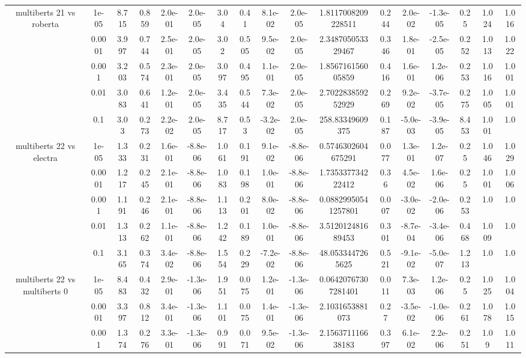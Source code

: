 \begin{tabular}{|c|c|c|c|c|c|c|c|c|c|c|c|c|c|c|c|c|}
\hline
\multirow{5}{*}{multiberts 21 vs roberta } & 1e-05 & 8.715 & 0.859 & 2.0e-01 & 2.0e-05 & 3.04 & 0.41 & 8.1e-02 & 2.0e-05 & 1.8117008209228511 & 0.244 & 2.0e-02 & -1.3e-05 & 0.25 & 1.024 & 1.016 \\
 & 0.0001 & 3.997 & 0.744 & 2.5e-01 & 2.0e-05 & 3.02 & 0.505 & 9.5e-02 & 2.0e-05 & 2.348705053329467 & 0.346 & 1.8e-01 & -2.5e-05 & 0.252 & 1.013 & 1.022 \\
 & 0.001 & 3.203 & 0.574 & 2.3e-01 & 2.0e-05 & 3.097 & 0.495 & 1.1e-01 & 2.0e-05 & 1.856716156005859 & 0.416 & 1.6e-01 & 1.2e-06 & 0.253 & 1.016 & 1.001 \\
 & 0.01 & 3.083 & 0.641 & 1.2e-01 & 2.0e-05 & 3.435 & 0.544 & 7.3e-02 & 2.0e-05 & 2.702283859252929 & 0.269 & 9.2e-02 & -3.7e-05 & 0.275 & 1.005 & 1.001 \\
 & 0.1 & 3.03 & 0.273 & 2.2e-02 & 2.0e-05 & 8.717 & 0.53 & -3.2e-02 & 2.0e-05 & 258.83349609375 & 0.187 & -5.0e-03 & -3.9e-05 & 8.453 & 1.001 & 1.0 \\
\hline
\multirow{5}{*}{multiberts 22 vs electra } & 1e-05 & 1.333 & 0.231 & 1.6e-01 & -8.8e-06 & 1.061 & 0.191 & 9.1e-02 & -8.8e-06 & 0.5746302604675291 & 0.077 & 1.3e-01 & 1.2e-07 & 0.25 & 1.046 & 1.029 \\
 & 0.0001 & 1.217 & 0.245 & 2.1e-01 & -8.8e-06 & 1.083 & 0.198 & 1.0e-01 & -8.8e-06 & 1.735337734222412 & 0.36 & 4.5e-02 & 1.6e-06 & 0.25 & 1.001 & 1.006 \\
 & 0.001 & 1.191 & 0.246 & 2.1e-01 & -8.8e-06 & 1.113 & 0.201 & 8.0e-02 & -8.8e-06 & 0.08829950541257801 & 0.007 & -3.0e-02 & -2.0e-06 & 0.253 & 1.0 & 1.0 \\
 & 0.01 & 1.313 & 0.262 & 1.1e-01 & -8.8e-06 & 1.242 & 0.189 & 1.0e-01 & -8.8e-06 & 3.512012481689453 & 0.301 & -8.7e-04 & -3.4e-06 & 0.468 & 1.009 & 1.0 \\
 & 0.1 & 3.165 & 0.374 & 3.4e-02 & -8.8e-06 & 1.554 & 0.229 & -7.2e-02 & -8.8e-06 & 48.0533447265625 & 0.521 & -9.1e-02 & -5.0e-07 & 1.213 & 1.0 & 1.0 \\
\hline
\multirow{5}{*}{multiberts 22 vs multiberts 0} & 1e-05 & 8.483 & 0.432 & 2.9e-01 & -1.3e-06 & 1.951 & 0.075 & 1.2e-01 & -1.3e-06 & 0.06420767307281401 & 0.011 & 7.3e-03 & 1.2e-06 & 0.25 & 1.025 & 1.004 \\
 & 0.0001 & 3.397 & 0.812 & 3.4e-01 & -1.3e-06 & 1.101 & 0.075 & 1.4e-01 & -1.3e-06 & 2.1031653881073 & 0.27 & -3.5e-02 & -1.0e-06 & 0.261 & 1.078 & 1.015 \\
 & 0.001 & 1.374 & 0.276 & 3.3e-01 & -1.3e-06 & 0.991 & 0.071 & 9.5e-02 & -1.3e-06 & 2.156371116638183 & 0.397 & 6.1e-02 & 2.2e-06 & 0.251 & 1.09 & 1.011 \\

\end{tabular}
